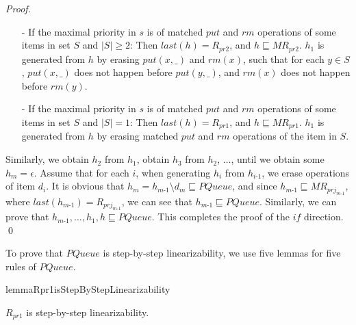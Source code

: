 \begin {proof}
\begin{itemize}
\item[-] If the maximal priority in $s$ is of matched $\textit{put}$ and $\textit{rm}$ operations of some items in set $S$ and $\vert S \vert \geq 2$: Then $\textit{last}(h) = R_{\textit{pr2}}$, and $h \sqsubseteq \textit{MR}_{\textit{pr2}}$. $h_1$ is generated from $h$ by erasing $\textit{put}(x,\_)$ and $\textit{rm}(x)$, such that for each $y \in S$, $\textit{put}(x,\_)$ does not happen before $\textit{put}(y,\_)$, and $\textit{rm}(x)$ does not happen before $\textit{rm}(y)$.

\item[-] If the maximal priority in $s$ is of matched $\textit{put}$ and $\textit{rm}$ operations of some items in set $S$ and $\vert S \vert = 1$: Then $\textit{last}(h) = R_{\textit{pr1}}$, and $h \sqsubseteq \textit{MR}_{\textit{pr1}}$. $h_1$ is generated from $h$ by erasing matched $\textit{put}$ and $\textit{rm}$ operations of the item in $S$.
\end{itemize}

Similarly, we obtain $h_2$ from $h_1$, obtain $h_3$ from $h_2$, $\ldots$, until we obtain some $h_m = \epsilon$. Assume that for each $i$, when generating $h_i$ from $h_{\textit{i-1}}$, we erase operations of item $d_i$. It is obvious that $h_m = h_{\textit{m-1}} \setminus d_m \sqsubseteq \textit{PQueue}$, and since $h_{\textit{m-1}} \sqsubseteq \textit{MR}_{\textit{prj}_{\textit{m-1}}}$, where $\textit{last}(h_{\textit{m-1}}) = R_{\textit{prj}_{\textit{m-1}}}$, we can see that $h_{\textit{m-1}} \sqsubseteq \textit{PQueue}$. Similarly, we can prove that $h_{\textit{m-1}},\ldots,h_1,h \sqsubseteq \textit{PQueue}$. This completes the proof of the $\textit{if}$ direction. \qed
\end {proof}


To prove that $\textit{PQueue}$ is step-by-step linearizability, we use five lemmas for five rules of $\textit{PQueue}$.


\begin{restatable}{lemma}{Rpr1isStepByStepLinearizability}
\label{lemma:Rpr1 is step-by-step linearizability}

$R_{\textit{pr1}}$ is step-by-step linearizability.

\end{restatable}

